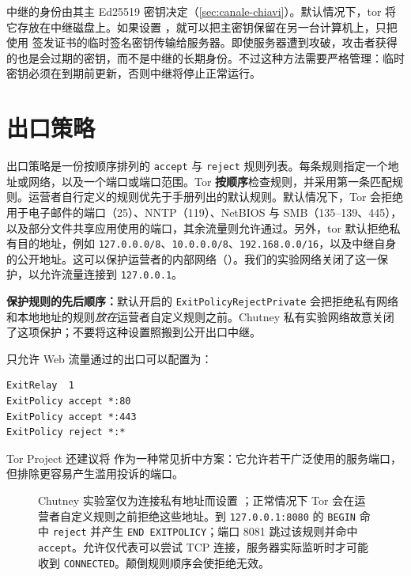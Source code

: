 中继的身份由其主 Ed25519 密钥决定（\cref{sec:canale-chiavi}）。默认情况下，tor 将它存放在中继磁盘上。如果设置 ，就可以把主密钥保留在另一台计算机上，只把使用  签发证书的临时签名密钥传输给服务器。即使服务器遭到攻破，攻击者获得的也是会过期的密钥，而不是中继的长期身份。不过这种方法需要严格管理：临时密钥必须在到期前更新，否则中继将停止正常运行。

\section{出口策略}\label{sec:relay-exitpolicy}

出口策略是一份按顺序排列的 \texttt{accept} 与 \texttt{reject} 规则列表。每条规则指定一个地址或网络，以及一个端口或端口范围。Tor \textbf{按顺序}检查规则，并采用第一条匹配规则。运营者自行定义的规则优先于手册列出的默认规则。默认情况下，Tor 会拒绝用于电子邮件的端口（25）、NNTP（119）、NetBIOS 与 SMB（135--139、445），以及部分文件共享应用使用的端口，其余流量则允许通过。另外，tor 默认拒绝私有目的地址，例如 \texttt{127.0.0.0/8}、\texttt{10.0.0.0/8}、\texttt{192.168.0.0/16}，以及中继自身的公开地址。这可以保护运营者的内部网络（）。我们的实验网络关闭了这一保护，以允许流量连接到 \texttt{127.0.0.1}。

\textbf{保护规则的先后顺序：}默认开启的 \texttt{ExitPolicyRejectPrivate} 会把拒绝私有网络和本地地址的规则\emph{放在}运营者自定义规则之前。Chutney 私有实验网络故意关闭了这项保护；不要将这种设置照搬到公开出口中继。

只允许 Web 流量通过的出口可以配置为：
\begin{lstlisting}[numbers=none]
ExitRelay  1
ExitPolicy accept *:80
ExitPolicy accept *:443
ExitPolicy reject *:*
\end{lstlisting}
Tor Project 还建议将  作为一种常见折中方案：它允许若干广泛使用的服务端口，但排除更容易产生滥用投诉的端口。

\begin{figure}[htbp]
\centering

\caption{Chutney 实验室仅为连接私有地址而设置 ；正常情况下 Tor 会在运营者自定义规则之前拒绝这些地址。到 \texttt{127.0.0.1:8080} 的 \texttt{BEGIN} 命中 \texttt{reject} 并产生 \texttt{END EXITPOLICY}；端口 8081 跳过该规则并命中 \texttt{accept}。允许仅代表可以尝试 TCP 连接，服务器实际监听时才可能收到 \texttt{CONNECTED}。颠倒规则顺序会使拒绝无效。}
\label{fig:policy}
\end{figure}

